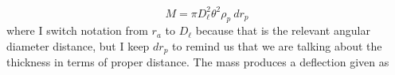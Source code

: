 \begin{equation}
  M = \pi D_\ell^2 \theta^2 \rho_p\ dr_p
\end{equation}
where I switch notation from $r_a$ to $D_\ell$ because that is the relevant angular diameter distance, but I keep $dr_p$ to remind us that we are talking about the thickness in terms of proper distance.  The mass produces a deflection given as
  